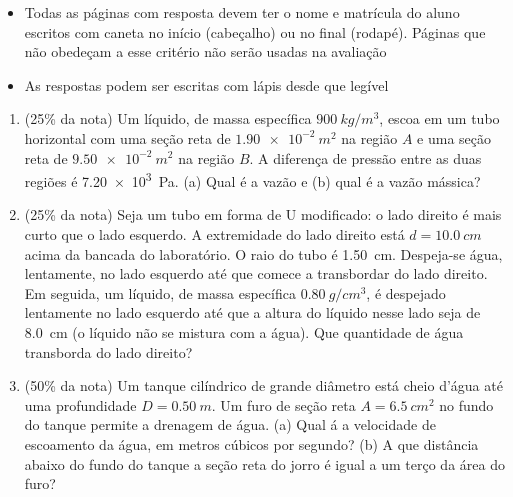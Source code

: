 \documentclass[12pt,a4paper,brazilian, fleqn]{article}
\newcommand{\ratio}[1]{(#1\% da nota)}
\begin{document}
\begin{tcolorbox}[colback=black!10, colframe=black!50, title=Observações]
    \begin{itemize}
        \item Todas as páginas com resposta devem ter o nome e matrícula do aluno
            escritos com caneta no início (cabeçalho) ou no final (rodapé). Páginas
            que não obedeçam a esse critério não serão usadas na avaliação
        \item As respostas podem ser escritas com lápis desde que legível
    \end{itemize}
\end{tcolorbox}

\begin{enumerate}
    \item \ratio{25} Um líquido, de massa específica \(\SI{900}{kg/m^3}\),
        escoa em um tubo horizontal com uma seção reta de \(\SI{1.90e-2}{m^2}\)
        na região \(A\) e uma seção reta de \(\SI{9.50e-2}{m^2}\) na região \(B\).
        A diferença de pressão entre as duas regiões é \SI{7.20e3}{Pa}.
        (a) Qual é a vazão e (b) qual é a vazão mássica?

    \item \ratio{25} Seja um tubo em forma de U modificado: o lado direito é mais curto que o lado
        esquerdo. A extremidade do lado direito está \(d=\SI{10,0}{cm}\) acima da bancada do laboratório.
        O raio do tubo é \SI{1,50}{cm}. Despeja-se água, lentamente, no lado esquerdo até que comece a
        transbordar do lado direito. Em seguida, um líquido, de massa específica \(\SI{0,80}{g/cm^3}\), é despejado
        lentamente no lado esquerdo até que a altura do líquido nesse lado seja de \SI{8,0}{cm} (o líquido não
        se mistura com a água). Que quantidade de água transborda do lado direito?

    \item \ratio{50} Um tanque cilíndrico de grande diâmetro está cheio d'água até uma profundidade
        \(D=\SI{0.50}{m}\). Um furo de seção reta \(A=\SI{6.5}{cm^2}\) no fundo do tanque permite 
        a drenagem de água. (a) Qual á a velocidade de escoamento da água, em metros cúbicos por segundo?
        (b) A que distância abaixo do fundo do tanque a seção reta do jorro é igual a um terço da área do furo?
\end{enumerate}
\end{document}
